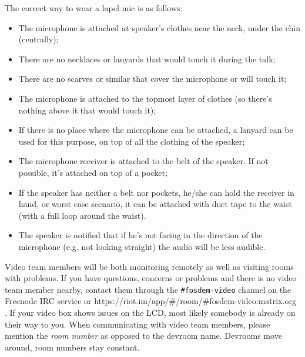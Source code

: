 \documentclass{article}
\begin{document}
The correct way to wear a lapel mic is as follows:
\begin{itemize}
  \item The microphone is attached at speaker's clothes near the neck, under the chin (centrally);
  \item There are no necklaces or lanyards that would touch it during the talk;
  \item There are no scarves or similar that cover the microphone or will touch it;
  \item The microphone is attached to the topmost layer of clothes (so there's nothing above it that would touch it);
  \item If there is no place where the microphone can be attached, a lanyard can be used for this purpose, on top of all the clothing of the speaker;
  \item The microphone receiver is attached to the belt of the speaker. If not possible, it's attached on top of a pocket;
  \item If the speaker has neither a belt nor pockets, he/she can hold the receiver in hand, or worst case scenario, it can be attached with duct tape to the waist (with a full loop around the waist).
  \item The speaker is notified that if he's not facing in the direction of the microphone (e.g. not looking straight) the audio will be less audible.
\end{itemize}

Video team members will be both monitoring remotely as well as visiting rooms with problems. If you have questions, concerns or problems and there is no video team member nearby, contact them through the \texttt{\#fosdem-video} channel on the Freenode IRC service or https://riot.im/app/\#/room/\#fosdem-video:matrix.org . If your video box shows issues on the LCD, most likely somebody is already on their way to you. When communicating with video team members, please mention the \emph{room number} as opposed to the devroom name. Devrooms move around, room numbers stay constant.
\end{document}
